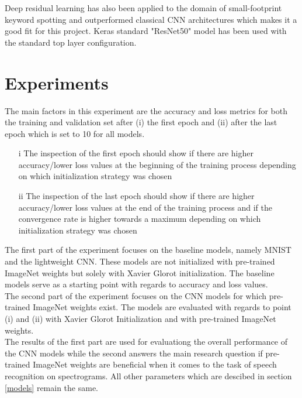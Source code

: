 \documentclass{article}
\theoremstyle{definition}
\theoremstyle{remark}
\begin{document}
Deep residual learning has also been applied to the domain of small-footprint keyword spotting and outperformed classical CNN architectures \cite{tang2018deep} which makes it a good fit for this project. Keras standard "ResNet50" model \cite{resnet50} has been used with the standard top layer configuration.




\section{Experiments}

The main factors in this experiment are the accuracy and loss metrics for both the training and validation set after (i) the first epoch and (ii) after the last epoch which is set to 10 for all models.\\

\begin{enumerate}
	\item[i] The inspection of the first epoch should show if there are higher accuracy/lower loss values at the beginning of the training process depending on which initialization strategy was chosen
	\item[ii] The inspection of the last epoch should show if there are higher accuracy/lower loss values at the end of the training process and if the convergence rate is higher towards a maximum depending on which initialization strategy was chosen
\end{enumerate}

The first part of the experiment focuses on the baseline models, namely MNIST and the lightweight CNN. These models are not initialized with pre-trained ImageNet weights but solely with Xavier Glorot initialization. The baseline models serve as a starting point with regards to accuracy and loss values.\\

The second part of the experiment focuses on the CNN models for which pre-trained ImageNet weights exist. The models are evaluated with regards to point (i) and (ii) with Xavier Glorot Initialization and with pre-trained ImageNet weights.\\

The results of the first part are used for evaluationg the overall performance of the CNN models while the second answers the main research question if pre-trained ImageNet weights are beneficial when it comes to the task of speech recognition on spectrograms. All other parameters which are descibed in section \ref{models} remain the same.
\end{document}
